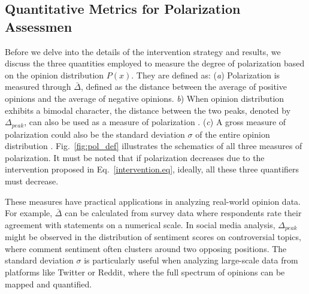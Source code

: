 \subsection{Quantitative Metrics for Polarization Assessmen}
\label{sec:quantifying_polarization}
Before we delve into the details of the intervention strategy and results, we discuss the three quantities employed to measure the degree of polarization based on the opinion distribution $P(x)$. They are defined as: ({\it a}) Polarization is measured through $\bar \Delta$, defined as the distance between the average of positive opinions and the average of negative opinions. {\it b}) When opinion distribution exhibits a bimodal character, the distance between the two peaks, denoted by $\Delta_{peak}$, can also be used as a measure of polarization \cite{depolarization-of-echo-chambers-by-random-dynamical-nudge}.
({\it c}) A gross measure of polarization could also be the standard deviation $\sigma$ of the entire opinion distribution \cite{link-recommendation-algorithms-and-dynamics-of-polarization-in-social-networks}. Fig.~\ref{fig:pol_def} illustrates the schematics of all three measures of polarization. It must be noted that if polarization decreases due to the intervention proposed in Eq.~\eqref{intervention.eq}, ideally, all these three quantifiers must decrease.

These measures have practical applications in analyzing real-world opinion data. For example, $\bar \Delta$ can be calculated from survey data where respondents rate their agreement with statements on a numerical scale. In social media analysis, $\Delta_{peak}$ might be observed in the distribution of sentiment scores on controversial topics, where comment sentiment often clusters around two opposing positions. The standard deviation $\sigma$ is particularly useful when analyzing large-scale data from platforms like Twitter or Reddit, where the full spectrum of opinions can be mapped and quantified.

